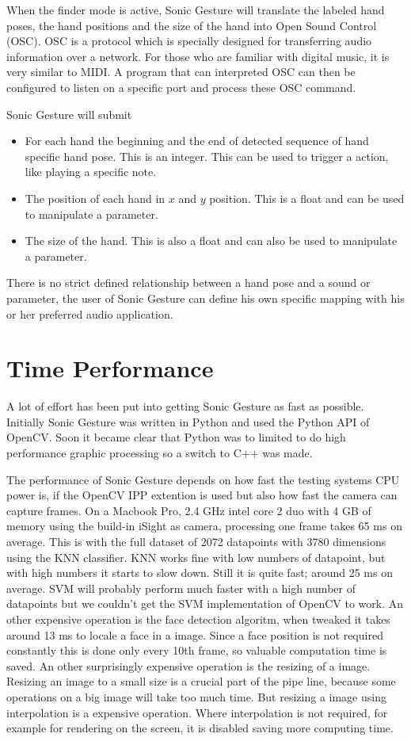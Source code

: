 When the finder mode is active, Sonic Gesture will translate the labeled hand poses, the hand positions and the size of the hand into Open Sound Control (OSC). OSC is a protocol which is specially designed for transferring audio information over a network. For those who are familiar with digital music, it is very similar to MIDI. A program that can interpreted OSC can then be configured to listen on a specific port and process these OSC command.

Sonic Gesture will submit
\begin{itemize}
	\item For each hand the beginning and the end of detected sequence of hand specific hand pose. This is an integer. This can be used to trigger a action, like playing a specific note.
	\item The position of each hand in $x$ and $y$ position. This is a float and can be used to manipulate a parameter.
	\item The size of the hand. This is also a float and can also be used to manipulate a parameter.
\end{itemize}

There is no strict defined relationship between a hand pose and a sound or parameter, the user of Sonic Gesture can define his own specific mapping with his or her preferred audio application. 

\section{Time Performance}
A lot of effort has been put into getting Sonic Gesture as fast as possible. Initially Sonic Gesture was written in Python and used the Python API of OpenCV. Soon it became clear that Python was to limited to do high performance graphic processing so a switch to C++ was made. 

The performance of Sonic Gesture depends on how fast the testing systems CPU power is, if the OpenCV IPP extention is used but also how fast the camera can capture frames. On a Macbook Pro, 2.4 GHz intel core 2 duo with 4 GB of memory using the build-in iSight as camera, processing one frame takes 65 ms on average. This is with the full dataset of 2072 datapoints with 3780 dimensions using the KNN classifier. KNN works fine with low numbers of datapoint, but with high numbers it starts to slow down. Still it is quite fast; around 25 ms on average. SVM will probably perform much faster with a high number of datapoints but we couldn't get the SVM implementation of OpenCV to work. An other expensive operation is the face detection algoritm, when tweaked it takes around 13 ms to locale a face in a image. Since a face position is not required constantly this is done only every 10th frame, so valuable computation time is saved. An other surprisingly expensive operation is the resizing of a image. Resizing an image to a small size is a crucial part of the pipe line, because some operations on a big image will take too much time. But resizing a image using interpolation is a expensive operation. Where interpolation is not required, for example for rendering on the screen, it is disabled saving more computing time. 



